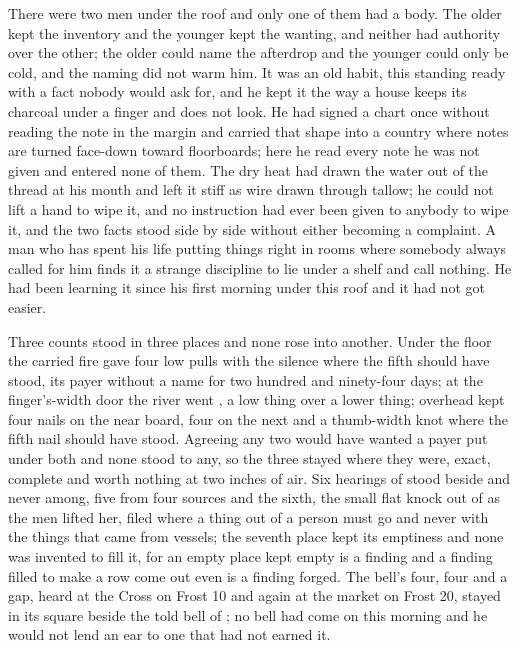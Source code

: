 There were two men under the roof and only one of them had a body. The older kept the inventory and the younger kept the wanting, and neither had authority over the other; the older could name the afterdrop and the younger could only be cold, and the naming did not warm him. It was an old habit, this standing ready with a fact nobody would ask for, and he kept it the way a house keeps its charcoal under a finger and does not look. He had signed a chart once without reading the note in the margin and carried that shape into a country where notes are turned face-down toward floorboards; here he read every note he was not given and entered none of them. The dry heat had drawn the water out of the thread at his mouth and left it stiff as wire drawn through tallow; he could not lift a hand to wipe it, and no instruction had ever been given to anybody to wipe it, and the two facts stood side by side without either becoming a complaint. A man who has spent his life putting things right in rooms where somebody always called for him finds it a strange discipline to lie under a shelf and call nothing. He had been learning it since his first morning under this roof and it had not got easier.

\scenebreak

Three counts stood in three places and none rose into another. Under the floor the carried fire gave four low pulls with the silence where the fifth should have stood, its payer without a name for two hundred and ninety-four days; at the finger's-width door the river went , a low thing over a lower thing; overhead  kept four nails on the near board, four on the next and a thumb-width knot where the fifth nail should have stood. Agreeing any two would have wanted a payer put under both and none stood to any, so the three stayed where they were, exact, complete and worth nothing at two inches of air. Six hearings of  stood beside and never among, five from four sources and the sixth, the small flat knock out of  as the men lifted her, filed where a thing out of a person must go and never with the things that came from vessels; the seventh place kept its emptiness and none was invented to fill it, for an empty place kept empty is a finding and a finding filled to make a row come out even is a finding forged. The bell's four, four and a gap, heard at the Cross on Frost 10 and again at the market on Frost 20, stayed in its square beside the told bell of ; no bell had come on this morning and he would not lend an ear to one that had not earned it.


